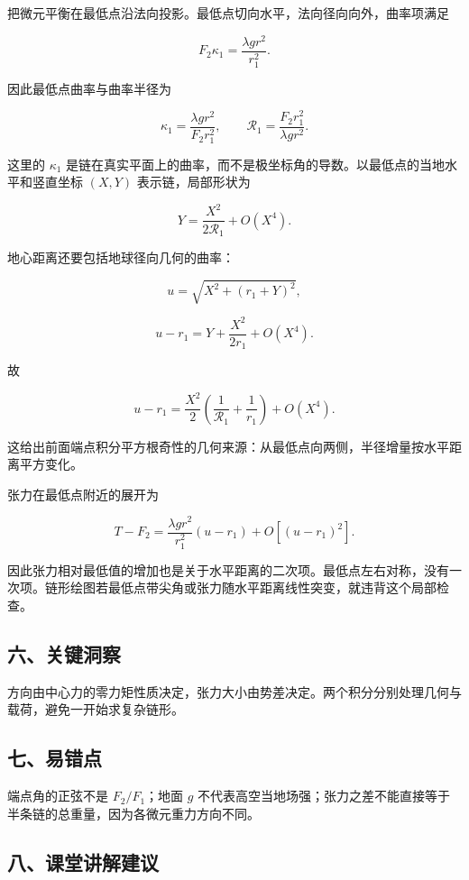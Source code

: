 \documentclass[12pt,a4paper,UTF8]{ctexart}
\begin{document}
把微元平衡在最低点沿法向投影。最低点切向水平，法向径向向外，曲率项满足

\[F_2\kappa_1=\frac{\lambda gr^2}{r_1^2}.\]

因此最低点曲率与曲率半径为

\[\kappa_1=\frac{\lambda gr^2}{F_2r_1^2},\qquad
\mathcal R_1=\frac{F_2r_1^2}{\lambda gr^2}.\]

这里的 \(\kappa_1\)
是链在真实平面上的曲率，而不是极坐标角的导数。以最低点的当地水平和竖直坐标
\((X,Y)\) 表示链，局部形状为

\[Y=\frac{X^2}{2\mathcal R_1}+O(X^4).\]

地心距离还要包括地球径向几何的曲率：

\[u=\sqrt{X^2+(r_1+Y)^2},\]

\[u-r_1=Y+\frac{X^2}{2r_1}+O(X^4).\]

故

\[u-r_1=\frac{X^2}{2}\left(\frac1{\mathcal R_1}+\frac1{r_1}\right)+O(X^4).\]

这给出前面端点积分平方根奇性的几何来源：从最低点向两侧，半径增量按水平距离平方变化。

张力在最低点附近的展开为

\[T-F_2=\frac{\lambda gr^2}{r_1^2}(u-r_1)+O[(u-r_1)^2].\]

因此张力相对最低值的增加也是关于水平距离的二次项。最低点左右对称，没有一次项。链形绘图若最低点带尖角或张力随水平距离线性突变，就违背这个局部检查。

\subsection{六、关键洞察}\label{ux516dux5173ux952eux6d1eux5bdf-3}

方向由中心力的零力矩性质决定，张力大小由势差决定。两个积分分别处理几何与载荷，避免一开始求复杂链形。

\subsection{七、易错点}\label{ux4e03ux6613ux9519ux70b9-3}

端点角的正弦不是 \(F_2/F_1\)；地面 \(g\)
不代表高空当地场强；张力之差不能直接等于半条链的总重量，因为各微元重力方向不同。

\subsection{八、课堂讲解建议}\label{ux516bux8bfeux5802ux8bb2ux89e3ux5efaux8bae-3}
\end{document}
